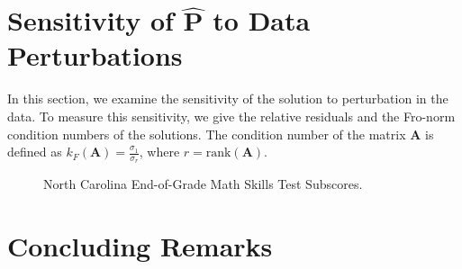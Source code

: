 \documentclass[titlepage,11pt,twoside]{article}
\begin{document}
\section{Sensitivity of $\mathbf{\hat{P}}$ to Data Perturbations}

In this section, we examine the sensitivity of the solution to perturbation in the data. To measure this sensitivity, we give the relative residuals and the Fro-norm condition numbers of the solutions. The condition number of the matrix $\mathbf{A}$ is defined as $k_{F}(\mathbf{A})=\frac{\sigma_{1}}{\sigma_{r}}$, where $r=\text{rank}(\mathbf{A})$. 






\begin{figure}[h]
\caption{North Carolina End-of-Grade Math Skills Test Subscores.}
\end{figure}



\section{Concluding Remarks}






\end{document}

